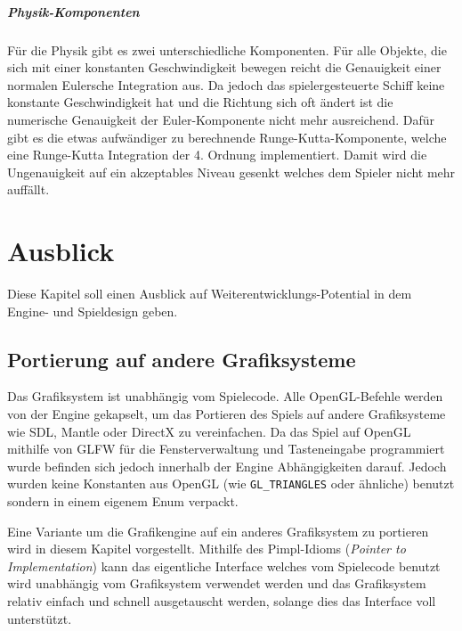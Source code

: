 \documentclass[12pt, a4paper, titlepage, hidelinks]{scrreprt}
\begin{document}
\paragraph{Physik-Komponenten}
Für die Physik gibt es zwei unterschiedliche Komponenten. Für alle Objekte, die sich mit einer konstanten Geschwindigkeit bewegen reicht die Genauigkeit einer normalen Eulersche Integration aus. Da jedoch das spielergesteuerte Schiff keine konstante Geschwindigkeit hat und die Richtung sich oft ändert ist die numerische Genauigkeit der Euler-Komponente nicht mehr ausreichend. Dafür gibt es die etwas aufwändiger zu berechnende Runge-Kutta-Komponente, welche eine Runge-Kutta Integration der 4. Ordnung implementiert. Damit wird die Ungenauigkeit auf ein akzeptables Niveau gesenkt welches dem Spieler nicht mehr auffällt.

\chapter{Ausblick}

Diese Kapitel soll einen Ausblick auf Weiterentwicklungs-Potential in dem Engine- und Spieldesign geben.

\section{Portierung auf andere Grafiksysteme}

Das Grafiksystem ist unabhängig vom Spielecode. Alle OpenGL-Befehle werden von der Engine gekapselt, um das Portieren des Spiels auf andere Grafiksysteme wie SDL, Mantle oder DirectX zu vereinfachen. Da das Spiel auf OpenGL mithilfe von GLFW für die Fensterverwaltung und Tasteneingabe programmiert wurde befinden sich jedoch innerhalb der Engine Abhängigkeiten darauf. Jedoch wurden keine Konstanten aus OpenGL (wie \texttt{GL\_TRIANGLES} oder ähnliche) benutzt sondern in einem eigenem Enum verpackt.


Eine Variante um die Grafikengine auf ein anderes Grafiksystem zu portieren wird in diesem Kapitel vorgestellt. Mithilfe des Pimpl-Idioms (\textit{Pointer to Implementation}) kann das eigentliche Interface welches vom Spielecode benutzt wird unabhängig vom Grafiksystem verwendet werden und das Grafiksystem relativ einfach und schnell ausgetauscht werden, solange dies das Interface voll unterstützt. 
\end{document}
